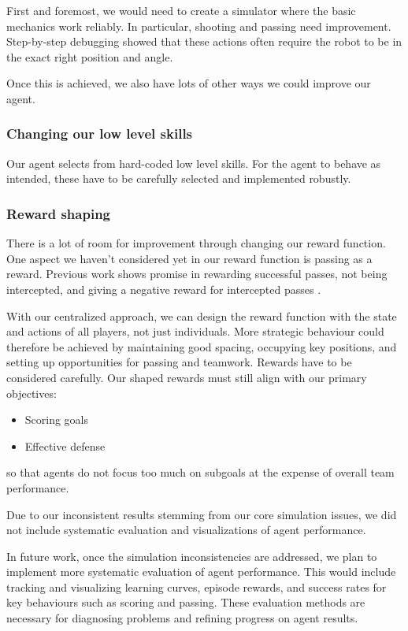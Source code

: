 First and foremost, we would need to create a simulator where the basic mechanics work reliably. In particular, shooting and passing need improvement. Step-by-step debugging showed that these actions often require the robot to be in the exact right position and angle.

Once this is achieved, we also have lots of other ways we could improve our agent.

\subsubsection{Changing our low level skills}
Our agent selects from hard-coded low level skills. For the agent to behave as intended, these have to be carefully selected and implemented robustly.

\subsubsection{Reward shaping}
There is a lot of room for improvement through changing our reward function.
One aspect we haven't considered yet in our reward function is passing as a reward.
Previous work shows promise in rewarding successful passes, not being intercepted, and giving a negative reward for intercepted passes
\cite{SRC2018Team}.

With our centralized approach, we can design the reward function with the state and actions of all players, not just individuals.
More strategic behaviour could therefore be achieved by maintaining good spacing, occupying key positions, and setting up opportunities for passing and teamwork.
Rewards have to be considered carefully. Our shaped rewards must still align with our primary objectives:
\begin{itemize}
    \item Scoring goals
    \item Effective defense
\end{itemize}
so that agents do not focus too much on subgoals at the expense of overall team performance.

Due to our inconsistent results stemming from our core simulation issues, we did not include systematic evaluation and visualizations of agent performance.

In future work, once the simulation inconsistencies are addressed, we plan to implement more systematic evaluation of agent performance. This would include tracking and visualizing learning curves, episode rewards, and success rates for key behaviours such as scoring and passing. These evaluation methods are necessary for diagnosing problems and refining progress on agent results.
